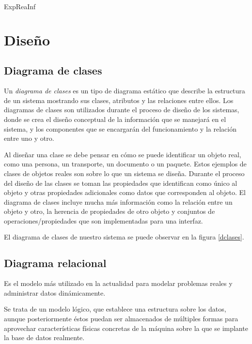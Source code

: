 \documentclass[11pt,a4paper,spanish,twoside]{book}
\begin{document}
{ExpReaInf}

\part{Diseño}
\chapter{Diagrama de clases}
Un \emph{diagrama de clases} es un tipo de diagrama estático que describe la
estructura de un sistema mostrando sus clases, atributos y las relaciones
entre ellos. Los diagramas de clases son utilizados durante el proceso de
diseño de los sistemas, donde se crea el diseño conceptual de la
información que se manejará en el sistema, y los componentes que se
encargarán del funcionamiento y la relación entre uno y otro.

Al diseñar una clase se debe pensar en cómo se puede identificar un objeto
real, como una persona, un transporte, un documento o un paquete. Estos
ejemplos de clases de objetos reales son sobre lo que un sistema se
diseña. Durante el proceso del diseño de las clases se toman las propiedades
que identifican como único al objeto y otras propiedades adicionales como
datos que corresponden al objeto. El diagrama de clases incluye mucha más
información como la relación entre un objeto y otro, la herencia de
propiedades de otro objeto y conjuntos de operaciones/propiedades que son
implementadas para una interfaz.

El diagrama de clases de nuestro sistema se puede observar en la figura
\ref{dclases}.

\begin{sidewaystable}
\end{sidewaystable}

\chapter{Diagrama relacional}
Es el modelo más utilizado en la actualidad para modelar problemas reales y 
administrar datos dinámicamente.

Se trata de un modelo lógico, que establece una estructura sobre los datos,
aunque posteriormente éstos puedan ser almacenados de múltiples formas para
aprovechar características físicas concretas de la máquina sobre la que se
implante la base de datos realmente.
\end{document}
